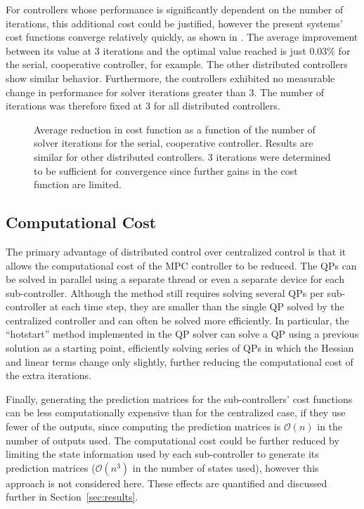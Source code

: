 For controllers whose performance is significantly dependent on the number of iterations, this additional cost could be justified, however the present systems' cost functions converge relatively quickly, as shown in .
The average improvement between its value at 3 iterations and the optimal value reached is just 0.03\% for the serial, cooperative controller, for example.
The other distributed controllers show similar behavior.
Furthermore, the controllers exhibited no measurable change in performance for solver iterations greater than 3.
The number of iterations was therefore fixed at 3 for all distributed controllers.


\begin{figure}
  \centering
  
  \caption{Average reduction in cost function as a function of the number of solver iterations for the serial, cooperative controller. Results are similar for other distributed controllers. 3 iterations were determined to be sufficient for convergence since further gains in the cost function are limited.}
  \label{fig:mpc:distributed:cost-function}
\end{figure}


\subsection{Computational Cost}

The primary advantage of distributed control over centralized control is that it allows the computational cost of the MPC controller to be reduced.
The QPs can be solved in parallel using a separate thread or even a separate device for each sub-controller.
Although the method still requires solving several QPs per sub-controller at each time step, they are smaller than the single QP solved by the centralized controller and can often be solved more efficiently.
In particular, the ``hotstart'' method implemented in the \qpoases{} QP solver can solve a QP using a previous solution as a starting point, efficiently solving series of QPs in which the Hessian and linear terms change only slightly, further reducing the computational cost of the extra iterations.

Finally, generating the prediction matrices for the sub-controllers' cost functions can be less computationally expensive than for the centralized case, if they use fewer of the outputs, since computing the prediction matrices is $\mathcal{O}(n)$ in the number of outputs used.
The computational cost could be further reduced by limiting the state information used by each sub-controller to generate its prediction matrices ($\mathcal{O}(n^3)$ in the number of states used), however this approach is not considered here.
These effects are quantified and discussed further in Section~\ref{sec:results}.

